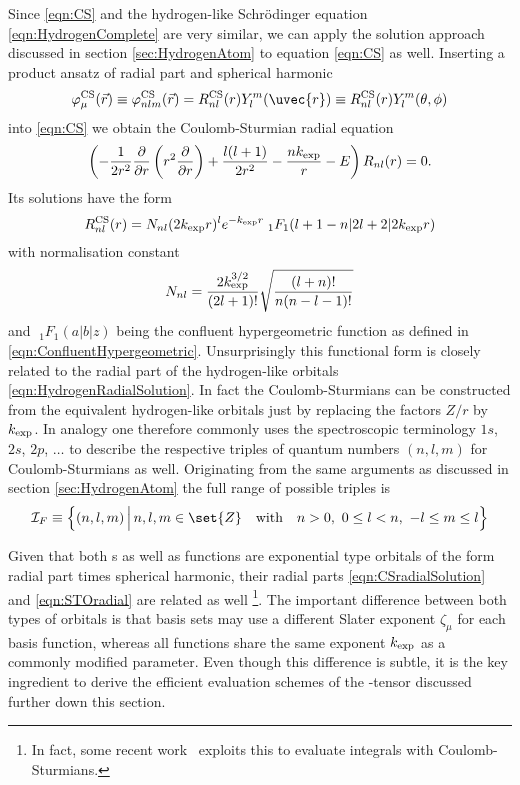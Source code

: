 Since \eqref{eqn:CS} and the hydrogen-like Schrödinger equation
\eqref{eqn:HydrogenComplete} are very similar,
we can apply the solution approach discussed in section \vref{sec:HydrogenAtom}
to equation \eqref{eqn:CS} as well.
Inserting a product ansatz of radial part and spherical harmonic
\begin{equation}
	\varphi^\text{CS}_\mu(\vec{r}) \equiv
	\varphi^\text{CS}_{nlm}(\vec{r}) = R^{\text{CS}}_{nl}(r) Y_l^m(\uvec{r})
	\equiv
	R^{\text{CS}}_{nl}(r) Y_l^m(\theta, \phi)
	\label{eqn:CSproduct}
\end{equation}
into \eqref{eqn:CS} we obtain the Coulomb-Sturmian radial equation
\begin{equation}
	\left( - \frac{1}{2r^2} \frac{\partial}{\partial r} \left( r^2 \frac{\partial}{\partial r} \right) + \frac{l (l+1)}{2 r^2}
	- \frac{nk_\text{exp}}{r} - E \right) R_{nl}(r) = 0.
	\label{eqn:CSRadial}
\end{equation}
Its solutions have the form
\begin{equation}
	R^\text{CS}_{nl}(r) = N_{nl} (2k_\text{exp} r)^l e^{-k_\text{exp} r}
	\;_1F_1\!\left(l+1-n \middle| 2l+2 \middle|2k_\text{exp} r\right)
	\label{eqn:CSradialSolution}
\end{equation}
with normalisation constant
\[ N_{nl} = \frac{2 k_\text{exp}^{3/2}}{(2l+1)!} \sqrt{ \frac{(l+n)!}{n (n-l-1)!}} \]
and $\;_1F_1\!\left(a|b|z\right)$ being the confluent hypergeometric function
as defined in \eqref{eqn:ConfluentHypergeometric}.
Unsurprisingly this functional form is closely related to the radial part of the
hydrogen-like orbitals \eqref{eqn:HydrogenRadialSolution}.
In fact the Coulomb-Sturmians can be constructed
from the equivalent hydrogen-like orbitals
just by replacing the factors $Z/r$ by $k_\text{exp}$.
In analogy one therefore commonly uses the spectroscopic terminology
$1s$, $2s$, $2p$, $\ldots$
to describe the respective triples
of quantum numbers $(n, l, m)$ for Coulomb-Sturmians as well.
Originating from the same arguments as discussed in section \ref{sec:HydrogenAtom}
the full range of possible triples is
\begin{equation}
	\Itpf \equiv \left\{ (n, l, m) \, \Big| \, n,l,m \in \set{Z}
		\quad \text{with} \quad
		n > 0, \  0 \leq l < n,\  -l \leq m \leq l\right\}
	\label{eqn:AllCSTriples}
\end{equation}

Given that both {\STO}s as well as \CS functions are exponential type orbitals
of the form radial part times spherical harmonic,
their radial parts \eqref{eqn:CSradialSolution} and \eqref{eqn:STOradial}
are related as well%
\footnote{In fact, some recent work~\cite{Avery2017} exploits this to evaluate
\STO \ERI integrals with Coulomb-Sturmians.}.
The important difference between both types of orbitals is
that {\STO} basis sets may use a different Slater exponent $\zeta_\mu$ for each
\STO basis function,
whereas all \CS functions share the same exponent $k_\text{exp}$
as a commonly modified parameter.
Even though this difference is subtle,
it is the key ingredient to derive the efficient evaluation schemes
of the \CS-\ERI tensor discussed further down this section.

